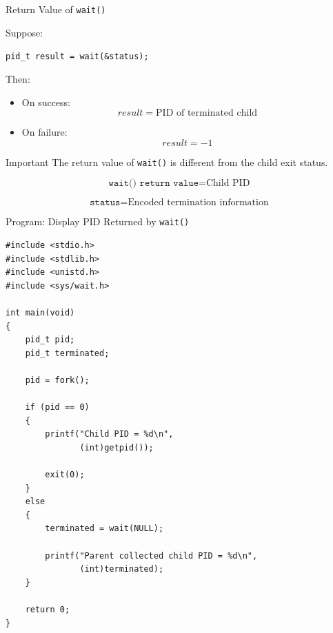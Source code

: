 \documentclass[aspectratio=169]{beamer}
\begin{document}
\begin{frame}{Return Value of \texttt{wait()}}

Suppose:

\begin{center}
\texttt{pid\_t result = wait(\&status);}
\end{center}

Then:

\begin{itemize}

    \item On success:
    \[
    result = \text{PID of terminated child}
    \]

    \item On failure:
    \[
    result = -1
    \]

\end{itemize}

\begin{block}{Important}
The return value of \texttt{wait()} is different from the child exit status.
\end{block}

\[
\boxed{
\texttt{wait() return value}
=
\text{Child PID}
}
\]

\[
\boxed{
\texttt{status}
=
\text{Encoded termination information}
}
\]

\end{frame}

\begin{frame}[fragile]{Program: Display PID Returned by \texttt{wait()}}

\begin{lstlisting}[style=cstyle]
#include <stdio.h>
#include <stdlib.h>
#include <unistd.h>
#include <sys/wait.h>

int main(void)
{
    pid_t pid;
    pid_t terminated;

    pid = fork();

    if (pid == 0)
    {
        printf("Child PID = %d\n",
               (int)getpid());

        exit(0);
    }
    else
    {
        terminated = wait(NULL);

        printf("Parent collected child PID = %d\n",
               (int)terminated);
    }

    return 0;
}
\end{lstlisting}

\end{frame}
\end{document}
